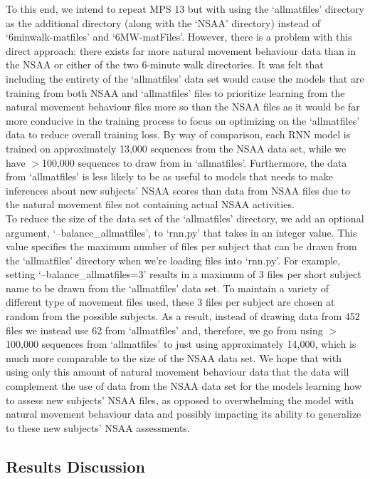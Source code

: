 \documentclass[12pt,twoside]{report}
\begin{document}
\quad To this end, we intend to repeat MPS 13 but with using the ‘allmatfiles’ directory as the additional directory (along with the ‘NSAA’ directory) instead of ‘6minwalk-matfiles’ and ‘6MW-matFiles’. However, there is a problem with this direct approach: there exists far more natural movement behaviour data than in the NSAA or either of the two 6-minute walk directories. It was felt that including the entirety of the ‘allmatfiles’ data set would cause the models that are training from both NSAA and ‘allmatfiles’ files to prioritize learning from the natural movement behaviour files more so than the NSAA files as it would be far more conducive in the training process to focus on optimizing on the ‘allmatfiles’ data to reduce overall training loss. By way of comparison, each RNN model is trained on approximately 13,000 sequences from the NSAA data set, while we have $>$100,000 sequences to draw from in ‘allmatfiles’. Furthermore, the data from ‘allmatfiles’ is less likely to be as useful to models that needs to make inferences about new subjects’ NSAA scores than data from NSAA files due to the natural movement files not containing actual NSAA activities.\\

\quad To reduce the size of the data set of the ‘allmatfiles’ directory, we add an optional argument, ‘--balance\_allmatfiles’, to ‘rnn.py’ that takes in an integer value. This value specifies the maximum number of files per subject that can be drawn from the ‘allmatfiles’ directory when we’re loading files into ‘rnn.py’. For example, setting ‘--balance\_allmatfiles=3’ results in a maximum of 3 files per short subject name to be drawn from the ‘allmatfiles’ data set. To maintain a variety of different type of movement files used, these 3 files per subject are chosen at random from the possible subjects. As a result, instead of drawing data from 452 files we instead use 62 from ‘allmatfiles’ and, therefore, we go from using $>$100,000 sequences from ‘allmatfiles’ to just using approximately 14,000, which is much more comparable to the size of the NSAA data set. We hope that with using only this amount of natural movement behaviour data that the data will complement the use of data from the NSAA data set for the models learning how to assess new subjects’ NSAA files, as opposed to overwhelming the model with natural movement behaviour data and possibly impacting its ability to generalize to these new subjects’ NSAA assessments.


\subsection{Results Discussion}
\end{document}
